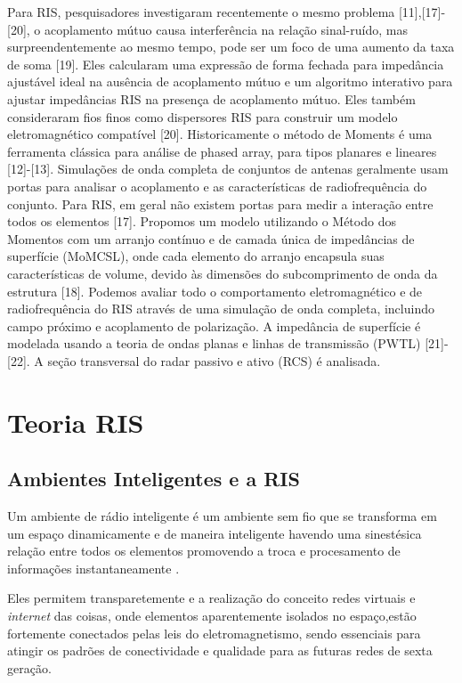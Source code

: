 \documentclass[
	12pt,				%
	openright,			%
	oneside,			%
	a4paper,			%
	english,			%
	brazil				%
	]{abntex2}
\begin{document}
Para RIS, pesquisadores investigaram recentemente o mesmo problema [11],[17]-[20], o acoplamento mútuo causa interferência na relação sinal-ruído, mas surpreendentemente ao mesmo tempo, pode ser um foco de uma aumento da taxa de soma [19]. Eles calcularam uma expressão de forma fechada para impedância ajustável ideal na ausência de acoplamento mútuo e um algoritmo interativo para ajustar impedâncias RIS na presença de acoplamento mútuo. Eles também consideraram fios finos como dispersores RIS para construir um modelo eletromagnético compatível [20].
Historicamente o método de Moments é uma ferramenta clássica para análise de phased array, para tipos planares e lineares [12]-[13]. Simulações de onda completa de conjuntos de antenas geralmente usam portas para analisar o acoplamento e as características de radiofrequência do conjunto. Para RIS, em geral não existem portas para medir a interação entre todos os elementos [17]. Propomos um modelo utilizando o Método dos Momentos com um arranjo contínuo e de camada única de impedâncias de superfície (MoMCSL), onde cada elemento do arranjo encapsula suas características de volume, devido às dimensões do subcomprimento de onda da estrutura [18]. Podemos avaliar todo o comportamento eletromagnético e de radiofrequência do RIS através de uma simulação de onda completa, incluindo campo próximo e acoplamento de polarização. A impedância de superfície é modelada usando a teoria de ondas planas e linhas de transmissão (PWTL) [21]-[22]. A seção transversal do radar passivo e ativo (RCS) é analisada.


\chapter{Teoria RIS} 

\section{Ambientes Inteligentes e a RIS} 

Um ambiente de rádio inteligente é um ambiente sem fio que se transforma em um espaço dinamicamente e de maneira inteligente havendo uma sinestésica relação entre todos os elementos promovendo a troca e procesamento  de informações instantaneamente \cite{ProgrammableEnvironment}. 

Eles permitem transparetemente e a realização do conceito redes virtuais e  \textit{internet} das coisas, onde elementos aparentemente isolados no espaço,estão fortemente conectados pelas leis do eletromagnetismo, sendo essenciais para atingir os padrões de conectividade e qualidade para as futuras redes de sexta geração.\cite{5GPPP}
\end{document}
